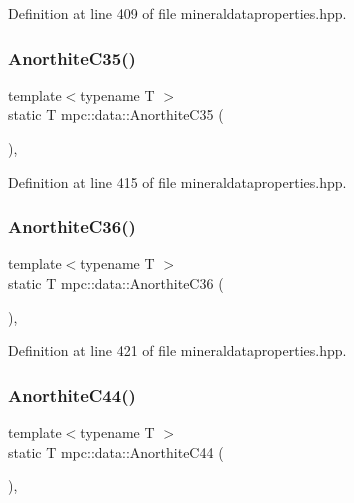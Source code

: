 Definition at line 409 of file mineraldataproperties.\+hpp.

\mbox{\label{namespacempc_1_1data_a8ac5e7981bc0ee65e296fe0c55000178}} 
\subsubsection{\texorpdfstring{Anorthite\+C35()}{AnorthiteC35()}}
{\footnotesize\ttfamily template$<$typename T $>$ \\
static T mpc\+::data\+::\+Anorthite\+C35 (\begin{DoxyParamCaption}{ }\end{DoxyParamCaption})\hspace{0.3cm}{\ttfamily [inline]}, {\ttfamily [static]}}



Definition at line 415 of file mineraldataproperties.\+hpp.

\mbox{\label{namespacempc_1_1data_a3bbc1c05c538dbbd7c0e1061820d9160}} 
\subsubsection{\texorpdfstring{Anorthite\+C36()}{AnorthiteC36()}}
{\footnotesize\ttfamily template$<$typename T $>$ \\
static T mpc\+::data\+::\+Anorthite\+C36 (\begin{DoxyParamCaption}{ }\end{DoxyParamCaption})\hspace{0.3cm}{\ttfamily [inline]}, {\ttfamily [static]}}



Definition at line 421 of file mineraldataproperties.\+hpp.

\mbox{\label{namespacempc_1_1data_a29c054f9ac1e39ce53342ba5f542c7a9}} 
\subsubsection{\texorpdfstring{Anorthite\+C44()}{AnorthiteC44()}}
{\footnotesize\ttfamily template$<$typename T $>$ \\
static T mpc\+::data\+::\+Anorthite\+C44 (\begin{DoxyParamCaption}{ }\end{DoxyParamCaption})\hspace{0.3cm}{\ttfamily [inline]}, {\ttfamily [static]}}



